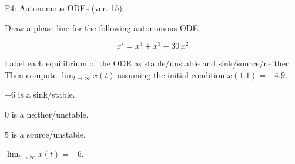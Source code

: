\begin{exercise}
  \begin{exerciseTitle}F4: Autonomous ODEs (ver. 15)\end{exerciseTitle}
  \begin{exerciseStatement}
    

      Draw a phase line for the following 
      autonomous ODE.
    

    
\[x'= x^{4} + x^{3} - 30 \, x^{2}\]

    

      Label each equilibrium of the ODE
      as stable/unstable and sink/source/neither.
      Then compute \(\lim_{t\to\infty}x(t)\)
      assuming the initial condition
      \(x( 1.1 )= -4.9\).
    

  \end{exerciseStatement}
  \begin{exerciseAnswer}
    

      \(-6\) is a sink/stable.
      
        \(0\) is a neither/unstable.
      
      \(5\) is a source/unstable.
    

    

      \(\lim_{t\to\infty}x(t)=-6\).
    

  \end{exerciseAnswer}
\end{exercise}